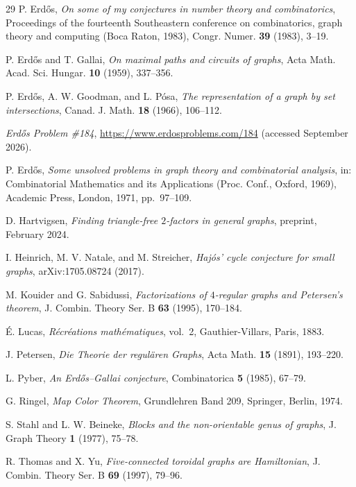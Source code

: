 \documentclass[a4paper,11pt]{amsart}
\theoremstyle{definition}
\theoremstyle{remark}
\begin{document}
\begin{thebibliography}{29}
 P. Erd\H{o}s, \emph{On some of my conjectures in number theory and combinatorics},
Proceedings of the fourteenth Southeastern conference on combinatorics, graph theory and computing (Boca
Raton, 1983), Congr. Numer. \textbf{39} (1983), 3--19.

 P. Erd\H{o}s and T. Gallai, \emph{On maximal paths and circuits of graphs}, Acta Math.
Acad. Sci. Hungar. \textbf{10} (1959), 337--356.

 P. Erd\H{o}s, A. W. Goodman, and L. P\'osa, \emph{The representation of a graph by set
intersections}, Canad. J. Math. \textbf{18} (1966), 106--112.

 \emph{Erd\H{o}s Problem \#184}, \url{https://www.erdosproblems.com/184} (accessed
September 2026).

 P. Erd\H{o}s, \emph{Some unsolved problems in graph theory and combinatorial analysis}, in:
Combinatorial Mathematics and its Applications (Proc. Conf., Oxford, 1969), Academic Press, London, 1971,
pp.\ 97--109.

 D. Hartvigsen, \emph{Finding triangle-free $2$-factors in general graphs},
preprint, February 2024.

 I. Heinrich, M. V. Natale, and M. Streicher, \emph{Haj\'os' cycle conjecture for small
graphs}, arXiv:1705.08724 (2017).

 M. Kouider and G. Sabidussi, \emph{Factorizations of $4$-regular graphs and Petersen's
theorem}, J. Combin. Theory Ser. B \textbf{63} (1995), 170--184.

 \'E. Lucas, \emph{R\'ecr\'eations math\'ematiques}, vol.\ 2, Gauthier-Villars, Paris,
1883.

 J. Petersen, \emph{Die Theorie der regul\"aren Graphs}, Acta Math. \textbf{15} (1891),
193--220.

 L. Pyber, \emph{An Erd\H{o}s--Gallai conjecture}, Combinatorica \textbf{5} (1985), 67--79.

 G. Ringel, \emph{Map Color Theorem}, Grundlehren Band 209, Springer, Berlin, 1974.

 S. Stahl and L. W. Beineke, \emph{Blocks and the non-orientable genus of graphs}, J. Graph
Theory \textbf{1} (1977), 75--78.

 R. Thomas and X. Yu, \emph{Five-connected toroidal graphs are Hamiltonian}, J. Combin.
Theory Ser. B \textbf{69} (1997), 79--96.

\end{thebibliography}
\end{document}
